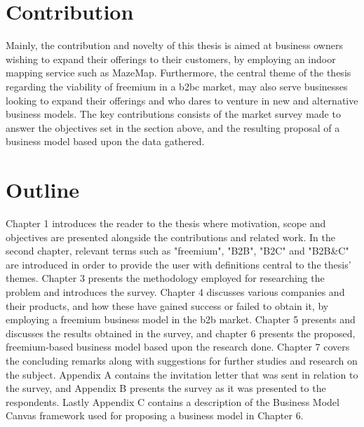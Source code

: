 \section{Contribution}
Mainly, the contribution and novelty of this thesis is aimed at business owners wishing to expand their offerings to their customers, by employing an indoor mapping service such as MazeMap. Furthermore, the central theme of the thesis regarding the viability of freemium in a \gls{b2bc} market, may also serve businesses looking to expand their offerings and who dares to venture in new and alternative business models. The key contributions consists of the market survey made to answer the objectives set in the section above, and the resulting proposal of a business model based upon the data gathered.   

\section{Outline}
Chapter 1 introduces the reader to the thesis where motivation, scope and objectives are presented alongside the contributions and related work. In the second chapter, relevant terms such as "freemium", "B2B", "B2C" and "B2B\&C" are introduced in order to provide the user with definitions central to the thesis' themes. Chapter 3 presents the methodology employed for researching the problem and introduces the survey. Chapter 4 discusses various companies and their products, and how these have gained success or failed to obtain it, by employing a freemium business model in the \gls{b2b} market. Chapter 5 presents and discusses the results obtained in the survey, and chapter 6 presents the proposed, freemium-based business model based upon the research done.
Chapter 7 covers the concluding remarks along with suggestions for further studies and research on the subject. Appendix A contains the invitation letter that was sent in relation to the survey, and Appendix B presents the survey as it was presented to the respondents. Lastly Appendix C contains a description of the Business Model Canvas framework used for proposing a business model in Chapter 6. 


